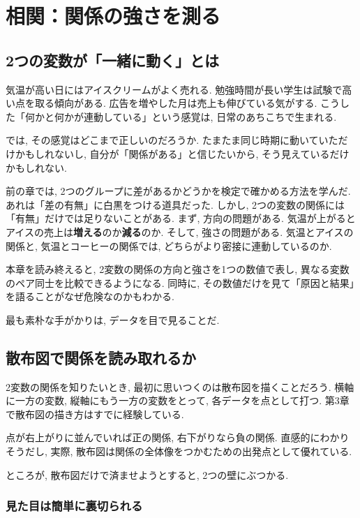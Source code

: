 ﻿\section{相関：関係の強さを測る}

\subsection{2つの変数が「一緒に動く」とは}

気温が高い日にはアイスクリームがよく売れる.
勉強時間が長い学生は試験で高い点を取る傾向がある.
広告を増やした月は売上も伸びている気がする.
こうした「何かと何かが連動している」という感覚は, 日常のあちこちで生まれる.

では, その感覚はどこまで正しいのだろうか.
たまたま同じ時期に動いていただけかもしれないし, 自分が「関係がある」と信じたいから, そう見えているだけかもしれない.

前の章では, 2つのグループに差があるかどうかを検定で確かめる方法を学んだ.
あれは「差の有無」に白黒をつける道具だった.
しかし, 2つの変数の関係には「有無」だけでは足りないことがある.
まず, 方向の問題がある.
気温が上がるとアイスの売上は\textbf{増える}のか\textbf{減る}のか.
そして, 強さの問題がある.
気温とアイスの関係と, 気温とコーヒーの関係では, どちらがより密接に連動しているのか.

本章を読み終えると, 2変数の関係の方向と強さを1つの数値で表し, 異なる変数のペア同士を比較できるようになる.
同時に, その数値だけを見て「原因と結果」を語ることがなぜ危険なのかもわかる.

最も素朴な手がかりは, データを目で見ることだ.


\subsection{散布図で関係を読み取れるか}

2変数の関係を知りたいとき, 最初に思いつくのは散布図を描くことだろう.
横軸に一方の変数, 縦軸にもう一方の変数をとって, 各データを点として打つ.
第3章で散布図の描き方はすでに経験している.

点が右上がりに並んでいれば正の関係, 右下がりなら負の関係.
直感的にわかりそうだし, 実際, 散布図は関係の全体像をつかむための出発点として優れている.

ところが, 散布図だけで済ませようとすると, 2つの壁にぶつかる.

\subsubsection*{見た目は簡単に裏切られる}

